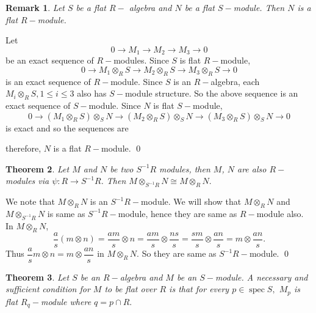 \documentclass[11pt]{amsart}
\newtheorem{theorem}{Theorem}[section]
\newtheorem{remark}[theorem]{Remark}%
\newcommand\isom{\mathrel{\stackon[-0.1ex]{\makebox*{\scalebox{1.08}{\AC}}{=\hfill\llap{=}}}{{\AC}}}}
\newcommand\nvisom{\rotatebox[origin=cc] {-90}{$ \isom $}}
\DeclareMathOperator{\spec}{\text{spec}}
\begin{document}
\begin{remark}
Let $S$ be a flat $R-$ algebra and $N$ be a flat $S-$module. Then $N$ is a flat $R-$module.
\end{remark}

\proof Let $$0\to M_1\to M_2\to M_3\to 0$$ be an exact sequence of $R-$modules. Since $S$ is flat $R-$module, $$0\to M_1\otimes_R S\to M_2\otimes_R S\to M_3\otimes_R S\to 0$$ is an exact sequence of $R-$module. Since $S$ is an $R-$algebra, each $M_i\otimes_R S,1\leq i\leq 3$ also has $S-$module structure. So the above sequence is an exact sequence of $S-$module. Since $N$ is flat $S-$module, $$0\to (M_1\otimes_R S)\otimes_S N\to (M_2\otimes_R S)\otimes_S N\to (M_3\otimes_R S)\otimes_S N\to 0$$ is exact and so the sequences are 

\begin{center}
\end{center}
 
therefore, $N$ is a flat $R-$module. \qed

\begin{theorem}
Let $M$ and $N$ be two $S^{-1}R$ modules, then $M$, $N$ are also $R-$modules via $\psi:R\to S^{-1}R$. Then $M\otimes_{S^{-1}R} N\cong M\otimes_R N.$
\end{theorem}

\proof We note that $M\otimes_R N$ is an $S^{-1}R-$module. We will show that $M\otimes_R N$ and $M\otimes_{S^{-1}R} N$ is same as $S^{-1}R-$module, hence they are same as $R-$module also. In $M\otimes_R N$, $$\dfrac{a}{s}(m\otimes n)=\dfrac{am}{s}\otimes n=\dfrac{am}{s}\otimes \dfrac{ns}{s}=\dfrac{sm}{s}\otimes \dfrac{an}{s}=m\otimes \dfrac{an}{s}.$$ Thus $\dfrac{a}{s}m\otimes n=m\otimes \dfrac{an}{s}$ in $M\otimes_R N$. So they are same as $S^{-1}R-$module. \qed

\begin{theorem}
Let $S$ be an $R-$algebra and $M$ be an $S-$module. A necessary and sufficient condition for $M$ to be flat over $R$ is that for every $p\in \spec S,$ $M_p$ is flat $R_q-$module where $q=p\cap R.$
\end{theorem}
\end{document}
